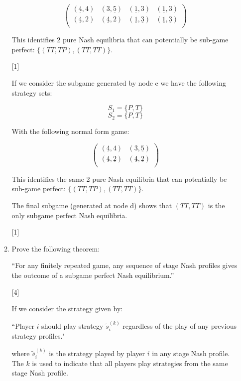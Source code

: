 \documentclass[12pt,a4paper]{article}
\begin{document}
\begin{enumerate}
\begin{enumerate}
            \[\begin{pmatrix}
            (\underline{4},4)&(3,\underline{5})&(\underline{1},3)&(\underline{1},3)\\
            (\underline{4},2)&(\underline{4},2)&(\underline{1},\underline{3})&(\underline{1},\underline{3})\\
            \end{pmatrix}\]

            This identifies 2 pure Nash equilibria that can potentially be sub-game perfect: \(\{(TT,TP),(TT,TT)\}\).

            \hfill[1]

            If we consider the subgame generated by node c we have the following strategy sets:

            \[S_1=\{P,T\}\]
            \[S_2=\{P,T\}\]

            With the following normal form game:

            \[\begin{pmatrix}
            (\underline{4},4)&(3,\underline{5})\\
            (\underline{4},\underline{2})&(\underline{4},\underline{2})\\
            \end{pmatrix}\]

            This identifies the same 2 pure Nash equilibria that can potentially be sub-game perfect: \(\{(TT,TP),(TT,TT)\}\).

            The final subgame (generated at node d) shows that \((TT,TT)\) is the only subgame perfect Nash equilibria.

            \hfill[1]


            \item Prove the following theorem:

            ``For any finitely repeated game, any sequence of stage Nash profiles gives the outcome of a subgame perfect Nash equilibrium.''

            \hfill[4]

            If we consider the strategy given by:

            ``Player $i$ should play strategy $\tilde s^{(k)}_i$ regardless of the play of any previous strategy profiles."

            where $\tilde s^{(k)}_i$ is the strategy played by player $i$ in any stage Nash profile. The $k$ is used to indicate that all players play strategies from the same stage Nash profile.


\end{enumerate}
\end{enumerate}
\end{document}
